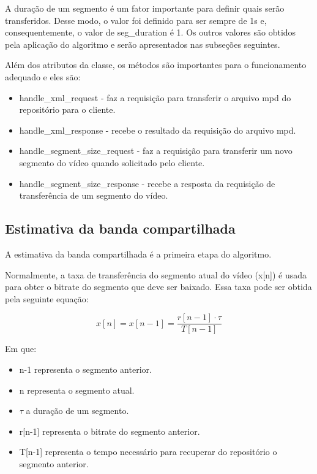 \documentclass[10pt,twocolumn,letterpaper]{article}
\begin{document}
	A duração de um segmento é um fator importante para definir quais serão transferidos. Desse modo, o valor foi definido para ser sempre de 1s e, consequentemente, o valor de seg\_duration é 1. Os outros valores são obtidos pela aplicação do algoritmo e serão apresentados nas subseções seguintes.
	
	Além dos atributos da classe, os métodos são importantes para o funcionamento adequado e eles são:
	
	\begin{itemize}
		\item handle\_xml\_request - faz a requisição para transferir o arquivo mpd do repositório para o cliente.
		\item handle\_xml\_response - recebe o resultado da requisição do arquivo mpd.
		\item handle\_segment\_size\_request - faz a requisição para transferir um novo segmento do vídeo quando solicitado pelo cliente.
		\item handle\_segment\_size\_response - recebe a resposta da requisição de transferência de um segmento do vídeo.
	\end{itemize}
	
	
	\subsection{Estimativa da banda compartilhada}
	
	A estimativa da banda compartilhada é a primeira etapa do algoritmo.
	
	Normalmente, a taxa de transferência do segmento atual do vídeo (x[n]) é usada para obter o bitrate do segmento que deve ser baixado. Essa taxa pode ser obtida pela seguinte equação:
	
	\begin{equation} \label{actual_throughput}
		x[n] = x[n-1] = \frac{r[n-1] \cdot \tau}{T[n-1]} 
	\end{equation}
	
	Em que:
	\begin{itemize}
		\item n-1 representa o segmento anterior.
		\item n representa o segmento atual.
		\item $\tau$ a duração de um segmento.
		\item r[n-1] representa o bitrate do segmento anterior.
		\item T[n-1] representa o tempo necessário para recuperar do repositório o segmento anterior.
	\end{itemize}
	
\end{document}
